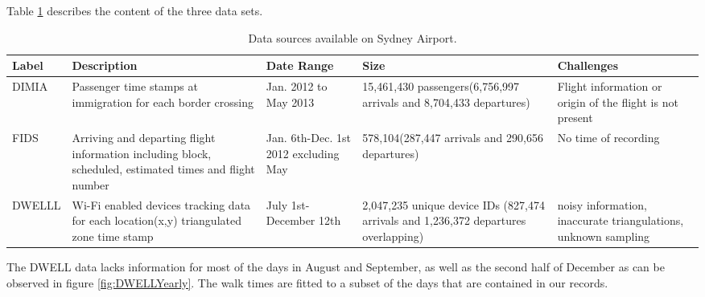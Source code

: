 \documentclass[11pt,onecolumn]{IEEEtran}
\begin{document}
Table \ref{tab:dataSources}  describes the content of the three data sets.
\begin{table}[Htp!]
	\caption{Data sources available on Sydney Airport.}
	\begin{tabular}{|l|p{5cm}|p{3cm}|p{3cm}|p{5cm}|}\hline
	Label &  Description & Date Range & Size &  Challenges\\
	\hline
	DIMIA &  
		Passenger time stamps at immigration for each border crossing & Jan. 2012 to May 2013 & 15,461,430 passengers(6,756,997 arrivals and 8,704,433 departures)  & Flight information or origin of the flight is not present\\
	\hline
	FIDS  &  Arriving and departing flight information including block, scheduled, estimated times and flight number &  Jan. 6th-Dec. 1st 2012 excluding May&  578,104(287,447 arrivals and 290,656 departures) &  No time of recording\\
	\hline
	DWELLL & Wi-Fi enabled devices tracking data for each  location(x,y) triangulated zone time stamp 	& July 1st-December 12th & 2,047,235 unique device IDs (827,474 arrivals and 1,236,372 departures overlapping)
	 & noisy information, inaccurate triangulations, unknown sampling\\
	\hline
	\end{tabular}
	\label{tab:dataSources}
\end{table}
The DWELL data lacks information for most of the days in August and September, as well as the second half of December as can be observed in figure \ref{fig:DWELLYearly}.
The walk times are fitted to a subset of the days that are contained in our records.
\end{document}
